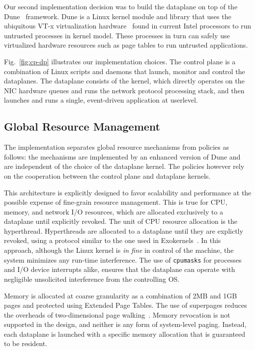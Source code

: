 Our second implementation decision was to build the \ix dataplane on
top of the Dune~\cite{belay2012dune} framework.  Dune is a Linux
kernel module and library that uses the ubiquitous VT-x
virtualization hardware~\cite{DBLP:journals/computer/UhligNRSMABKLS05}
found in current Intel processors to run untrusted processes in kernel
model.  These processes in turn can safely use virtualized hardware
resources such as page tables to run untrusted applications.

Fig.~\ref{fig:cp-dp} illustrates our implementation choices.  The \ix
control plane is a combination of Linux scripts and daemons that
launch, monitor and control the \ix dataplanes. The dataplane consists
of the \ix kernel, which directly operates on the NIC hardware queues
and runs the network protocol processing stack, and then launches and
runs a single, event-driven application at userlevel.

\subsection{Global Resource Management}
\label{sec:impl:gresource}

The implementation separates global resource mechanisms from policies
as follows: the mechanisms are implemented by an enhanced version of
Dune and are independent of the choice of the dataplane kernel.  The
policies however rely on the cooperation between the control plane and
dataplane kernels.

This architecture is explicitly designed to favor scalability and
performance at the possible expense of fine-grain resource management.
This is true for CPU, memory, and network I/O resources, which are
allocated exclusively to a dataplane until explicitly revoked.  The
unit of CPU resource allocation is the hyperthread.  Hyperthreads are
allocated to a dataplane until they are explictly revoked, using a
protocol similar to the one used in
Exokernels~\cite{DBLP:conf/sosp/EnglerKO95}.  In this approach,
although the Linux kernel is \emph{in fine} in control of the
machine, the system minimizes any run-time interference.  The use of
\texttt{cpumasks} for processes and I/O device interrupts alike,
ensures that the dataplane can operate with negligible unsolicited
interference from the controlling OS.

Memory is allocated at coarse granularity as a combination of 2MB and
1GB pages and protected using Extended Page Tables.  The use of
superpages reduces the overheads of two-dimensional page
walking~\cite{DBLP:conf/asplos/BhargavaSSM08}.  Memory revocation is
not supported in the design, and neither is any form of system-level
paging.  Instead, each dataplane is launched with a specific memory
allocation that is guaranteed to be resident.

